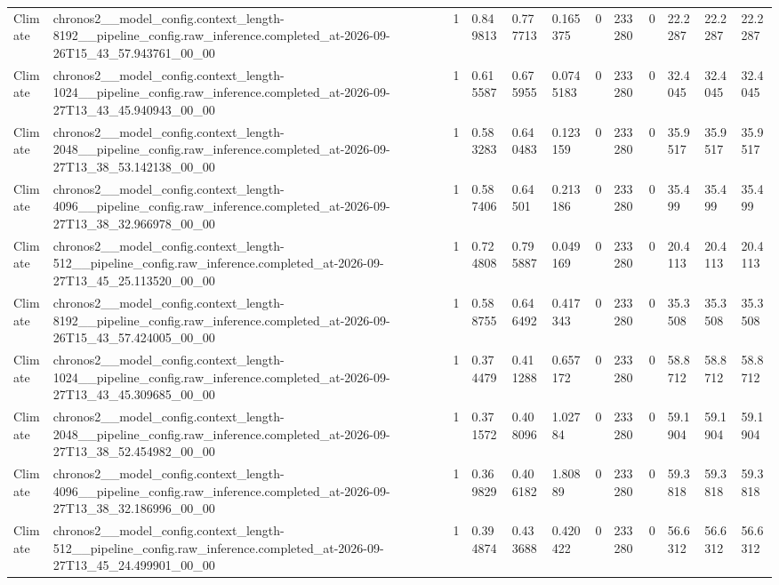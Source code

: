 \begin{tabular}{llllllllllll}
Climate & chronos2\_\_model\_config.context\_length-8192\_\_pipeline\_config.raw\_inference.completed\_at-2026-09-26T15\_43\_57.943761\_00\_00 & 1 & 0.849813 & 0.777713 & 0.165375 & 0 & 233280 & 0 & 22.2287 & 22.2287 & 22.2287 \\
Climate & chronos2\_\_model\_config.context\_length-1024\_\_pipeline\_config.raw\_inference.completed\_at-2026-09-27T13\_43\_45.940943\_00\_00 & 1 & 0.615587 & 0.675955 & 0.0745183 & 0 & 233280 & 0 & 32.4045 & 32.4045 & 32.4045 \\
Climate & chronos2\_\_model\_config.context\_length-2048\_\_pipeline\_config.raw\_inference.completed\_at-2026-09-27T13\_38\_53.142138\_00\_00 & 1 & 0.583283 & 0.640483 & 0.123159 & 0 & 233280 & 0 & 35.9517 & 35.9517 & 35.9517 \\
Climate & chronos2\_\_model\_config.context\_length-4096\_\_pipeline\_config.raw\_inference.completed\_at-2026-09-27T13\_38\_32.966978\_00\_00 & 1 & 0.587406 & 0.64501 & 0.213186 & 0 & 233280 & 0 & 35.499 & 35.499 & 35.499 \\
Climate & chronos2\_\_model\_config.context\_length-512\_\_pipeline\_config.raw\_inference.completed\_at-2026-09-27T13\_45\_25.113520\_00\_00 & 1 & 0.724808 & 0.795887 & 0.049169 & 0 & 233280 & 0 & 20.4113 & 20.4113 & 20.4113 \\
Climate & chronos2\_\_model\_config.context\_length-8192\_\_pipeline\_config.raw\_inference.completed\_at-2026-09-26T15\_43\_57.424005\_00\_00 & 1 & 0.588755 & 0.646492 & 0.417343 & 0 & 233280 & 0 & 35.3508 & 35.3508 & 35.3508 \\
Climate & chronos2\_\_model\_config.context\_length-1024\_\_pipeline\_config.raw\_inference.completed\_at-2026-09-27T13\_43\_45.309685\_00\_00 & 1 & 0.374479 & 0.411288 & 0.657172 & 0 & 233280 & 0 & 58.8712 & 58.8712 & 58.8712 \\
Climate & chronos2\_\_model\_config.context\_length-2048\_\_pipeline\_config.raw\_inference.completed\_at-2026-09-27T13\_38\_52.454982\_00\_00 & 1 & 0.371572 & 0.408096 & 1.02784 & 0 & 233280 & 0 & 59.1904 & 59.1904 & 59.1904 \\
Climate & chronos2\_\_model\_config.context\_length-4096\_\_pipeline\_config.raw\_inference.completed\_at-2026-09-27T13\_38\_32.186996\_00\_00 & 1 & 0.369829 & 0.406182 & 1.80889 & 0 & 233280 & 0 & 59.3818 & 59.3818 & 59.3818 \\
Climate & chronos2\_\_model\_config.context\_length-512\_\_pipeline\_config.raw\_inference.completed\_at-2026-09-27T13\_45\_24.499901\_00\_00 & 1 & 0.394874 & 0.433688 & 0.420422 & 0 & 233280 & 0 & 56.6312 & 56.6312 & 56.6312 \\

\end{tabular}
